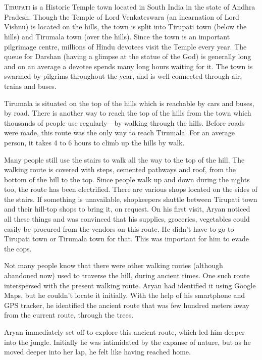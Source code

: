 \chapter{}

\lettrine{T}{irupati} is a Historic Temple town located in South India in the state of Andhra
Pradesh. Though the Temple of Lord Venkateswara (an incarnation of Lord Vishnu)
is located on the hills, the town is split into Tirupati town (below the hills)
and Tirumala town (over the hills). Since the town is an important pilgrimage
centre, millions of Hindu devotees visit the Temple every year. The queue for
Darshan (having a glimpse at the statue of the God) is generally long and on an
average a devotee spends many long hours waiting for it. The town is swarmed by
pilgrims throughout the year, and is well-connected through air, trains and
buses.

Tirumala is situated on the top of the hills which is reachable by cars and
buses, by road. There is another way to reach the top of the hills from the town
which thousands of people use regularly—by walking through the hills. Before
roads were made, this route was the only way to reach Tirumala. For an average
person, it takes 4 to 6 hours to climb up the hills by walk.

Many people still use the stairs to walk all the way to the top of the hill. The
walking route is covered with steps, cemented pathways and roof, from the bottom
of the hill to the top. Since people walk up and down during the nights too, the
route has been electrified. There are various shops located on the sides of the
stairs. If something is unavailable, shopkeepers shuttle between Tirupati town
and their hill-top shops to bring it, on request. On his first visit, Aryan
noticed all these things and was convinced that his supplies, groceries,
vegetables could easily be procured from the vendors on this route. He didn't
have to go to Tirupati town or Tirumala town for that. This was important for
him to evade the cops.

Not many people know that there were other walking routes (although abandoned
now) used to traverse the hill, during ancient times. One such route
interspersed with the present walking route. Aryan had identified it using
Google Maps, but he couldn't locate it initially. With the help of his
smartphone and GPS tracker, he identified the ancient route that was few hundred
meters away from the current route, through the trees.

Aryan immediately set off to explore this ancient route, which led him deeper
into the jungle. Initially he was intimidated by the expanse of nature, but as
he moved deeper into her lap, he felt like having reached home.

